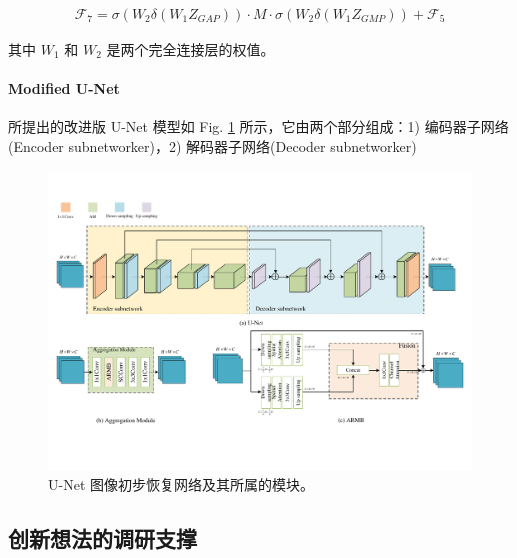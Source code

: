 \documentclass[a4paper, 10pt]{article}
\begin{document}
		\begin{equation}
			\begin{aligned}
				\mathcal{F}_7 = \sigma \left( W_2 \delta (W_1 Z_{GAP}) \right) \cdot M \cdot \sigma \left( W_2 \delta (W_1 Z_{GMP})\right) +  \mathcal{F}_5
			\end{aligned}
			\label{eq: recalibrated feature map}
		\end{equation}
		
		其中 $W_1$ 和 $W_2$ 是两个完全连接层的权值。
		
		\paragraph{Modified U-Net}
		
		所提出的改进版 U-Net 模型如 Fig. \ref{fig: U-Net and AM} 所示，它由两个部分组成：1) 编码器子网络(Encoder subnetworker)，2) 解码器子网络(Decoder subnetworker)
		
		\begin{figure}[htb]
			\centering 
			\includegraphics[width=\columnwidth]{picture/LLIE/My Architecture/U-Net and AM}
			\caption{
				\label{fig: U-Net and AM} 
				U-Net 图像初步恢复网络及其所属的模块。
			}
		\end{figure}
		
		
		
		\subsection{创新想法的调研支撑}
		
\end{document}
